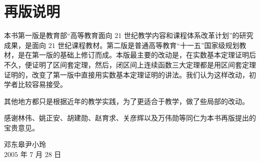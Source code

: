 \chapter*{再版说明}

本书第一版是教育部``高等教育面向 $21$ 世纪教学内容和课程体系改革计划''的研究成果，是面向 $21$ 世纪课程教材。第二版是普通高等教育``十一五''国家级规划教材，是在第一版的基础上修订而成。本版最主要的改动是，在实数基本定理证明后不久，便证明了区间套定理，然后，闭区间上连续函数三大定理都是用区间套定理证明的，改变了第一版中直接用实数基本定理证明的讲法。我们认为这样改动，初学者比较容易接受。

其他地方都只是根据近年的教学实践，为了更适合于教学，做了些局部的改动。

感谢林伟、姚正安、胡建勋、赵育求、关彦辉以及万伟勋等同仁为本书再版提出的宝贵意见。

\vspace{2em}
\begin{flushright}
邓东皋\quad 尹小玲\\[0.5em]
$2005$ 年 $7$ 月 $28$ 日
\end{flushright}
\clearpage
